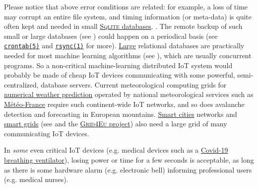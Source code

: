 {{ Please notice that above error conditions are related: for example, a
 loss of time may corrupt an entire file system,
  and timing information (or meta-data)
   is quite often kept and needed in
 small \href{http://sqlite.org/}{\textsc{Sqlite} databases}.
 . The remote backup
    of such
 small or large databases (see \cite{Date:2005:Database-in-Depth,
   kornacker:2015:impala}) could happen on a periodical basis (see
 \href{https://man7.org/linux/man-pages/man5/crontab.5.html}{\texttt{crontab(5)}}
 and 
 \href{https://man7.org/linux/man-pages/man1/rsync.1.html}{\texttt{rsync(1)}}
 for
 more). \href{https://softwareengineering.stackexchange.com/a/332071/40065}{Large}
 relational databases are practically needed for most machine learning
  algorithms (see
 \cite{flach:2012:machine-learning}), which are usually concurrent
  programs. So a non-critical machine-learning
 distributed IoT system would probably be made of cheap IoT devices
 communicating with some powerful, semi-centralized, database
  
  servers. Current meteorological computing
 grids for
 \href{https://en.wikipedia.org/wiki/Numerical_weather_prediction}{numerical
   weather prediction} operated by national meteorological services
 such as \href{http://meteofrance.com/}{Météo-France} require such
 continent-wide IoT networks, and so does 
  avalanche detection and forecasting in European
   
 mountains. \href{https://en.wikipedia.org/wiki/Smart_city}{Smart
   cities} networks and
 \href{https://en.wikipedia.org/wiki/Smart_grid}{smart grids} (see
 \cite{belarbi:2004:vehicle, mclaren:2015:sharing,
   delons:2008:pirandello, bakken:2014:smart-grids} and
  the
 \href{https://www.enedis.fr/grid4eu}{\textsc{Grid4Eu} project}) also
 need a large grid of many communicating IoT devices.

 In \emph{some} even critical IoT devices (e.g. medical devices
  such  as a \href{https://github.com/Recovid/}{Covid-19 breathing
   ventilator}), losing power or time for a few seconds is acceptable,
 as long as there is some hardware alarm (e.g. electronic bell)
 informing professional users (e.g. medical nurses).

}}
